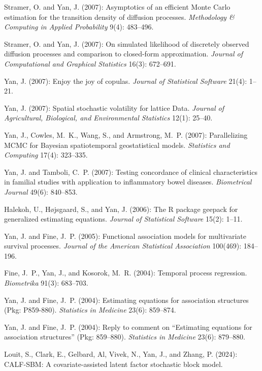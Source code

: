 \documentclass[Statistics]{vita}
\begin{document}
\begin{vita}
\begin{Publications}
\begin{RefereedJournalArticles}
  \item Stramer, O. and Yan, J. (2007): Asymptotics of an efficient {M}onte {C}arlo estimation for the transition density of diffusion processes. {\em Methodology \& Computing in Applied Probability\/} 9(4): 483--496.
  \item Stramer, O. and Yan, J. (2007): On simulated likelihood of discretely observed diffusion processes and comparison to closed-form approximation. {\em Journal of Computational and Graphical Statistics\/} 16(3): 672--691.
  \item Yan, J. (2007): Enjoy the joy of copulas. {\em Journal of Statistical Software\/} 21(4): 1--21.
  \item Yan, J. (2007): Spatial stochastic volatility for lattice Data. \emph{Journal of Agricultural, Biological, and Environmental Statistics} 12(1): 25--40.
  \item Yan, J., Cowles, M.~K., Wang, S., and  Armstrong, M.~P. (2007): Parallelizing MCMC for Bayesian spatiotemporal geostatistical models. {\em Statistics and Computing\/} 17(4): 323--335.
  \item Yan, J. and Tamboli, C.~P. (2007): Testing concordance of clinical characteristics in familial studies with application to inflammatory bowel diseases. {\em Biometrical Journal\/} 49(6): 840--853.
  \item Halekoh, U., H\o{}jsgaard, S., and Yan, J. (2006): The {R} package geepack for generalized estimating equations. {\em Journal of Statistical Software\/} 15(2): 1--11.
  \item Yan, J. and Fine, J.~P. (2005): Functional association models for multivariate survival processes. {\em Journal of the American Statistical Association\/} 100(469): 184--196.
  \item Fine, J.~P., Yan, J., and Kosorok, M.~R. (2004): Temporal process regression. {\em Biometrika\/} 91(3): 683--703.
  \item Yan, J. and Fine, J.~P. (2004): Estimating equations for association structures ({P}kg: P859-880). {\em Statistics in Medicine\/} 23(6): 859--874.
  \item Yan, J. and Fine, J.~P. (2004): Reply to comment on ``{E}stimating equations for association structures'' ({P}kg: 859--880). {\em Statistics in Medicine\/} 23(6): 879--880.
  \end{RefereedJournalArticles}
  \begin{UnderReview}
  \item *Louit, S., Clark, E., Gelbard, Al, Vivek, N., Yan, J., and Zhang, P. (2024): CALF-SBM: A covariate-assisted latent factor stochastic block model.

\end{UnderReview}
\end{Publications}
\end{vita}
\end{document}
